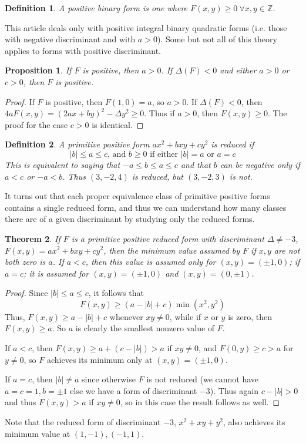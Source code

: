 \documentclass[12pt]{article}
\newcommand{\BZ}{\mathbb{Z}}
\newtheorem{thm}{Theorem}
\newtheorem{prop}[thm]{Proposition}
\newtheorem{defn}{Definition}
\begin{document}
\begin{defn} A \emph{positive} binary form is one where $F(x,y)\geq 0\  \forall x,y\in\BZ $. 
\end{defn}
This article deals only with positive integral binary quadratic forms (i.e. those with negative discriminant and with $a>0$). Some but not all of this theory applies to forms with positive discriminant.

\begin{prop}
If $F$ is positive, then $a>0$. If $\Delta(F)<0$ and either $a>0$ or $c>0$, then $F$ is positive.
\end{prop}
\begin{proof}
If $F$ is positive, then $F(1,0)=a$, so $a>0$.
\newline
If $\Delta(F)<0$, then $4aF(x,y) = (2ax+by)^2-\Delta y^2 \geq 0$. Thus if $a>0$, then $F(x,y)\geq 0$. The proof for the case $c>0$ is identical.
\end{proof}

\begin{defn}A primitive positive form $ax^2+bxy+cy^2$ is \emph{reduced} if
	\[|b|\leq a\leq c\text{, and }b\geq 0\text{ if either }|b|=a\text{ or }a=c
\]
This is equivalent to saying that $-a\leq b\leq a\leq c$ and that $b$ can be negative only if $a<c$ or $-a<b$. Thus $(3,-2,4)$ is reduced, but $(3,-2,3)$ is not.
\end{defn}

It turns out that each proper equivalence class of primitive positive forms contains a single reduced form, and thus we can understand how many classes there are of a given discriminant by studying only the reduced forms.

\begin{thm} If $F$ is a primitive positive reduced form with discriminant $\Delta\neq -3$, $F(x,y)=ax^2+bxy+cy^2$, then the minimum value assumed by $F$ if $x,y$ are not both zero is $a$. If $a<c$, then this value is assumed only for $(x,y)=(\pm1,0)$; if $a=c$; it is assumed for $(x,y)=(\pm 1,0)$ and $(x,y)=(0,\pm 1)$.
\end{thm}
\begin{proof}
Since $|b|\leq a\leq c$, it follows that
\[F(x,y)\geq (a-|b|+c)\min(x^2,y^2)\]
Thus, $F(x,y)\geq a-|b|+c$ whenever $xy\neq 0$, while if $x$ or $y$ is zero, then $F(x,y)\geq a$. So $a$ is clearly the smallest nonzero value of $F$.

If $a<c$, then $F(x,y)\geq a+(c-|b|)>a$ if $xy\neq 0$, and $F(0,y)\geq c>a$ for $y\neq 0$, so $F$ achieves its minimum only at $(x,y)=(\pm 1,0)$.

If $a=c$, then $|b|\neq a$ since otherwise $F$ is not reduced (we cannot have $a=c=1, b=\pm 1$ else we have a form of discriminant $-3$). Thus again $c-|b|>0$ and thus $F(x,y)>a$ if $xy\neq 0$, so in this case the result follows as well.
\end{proof}
Note that the reduced form of discriminant $-3$, $x^2+xy+y^2$, also achieves its minimum value at $(1,-1),(-1,1)$.
\end{document}
